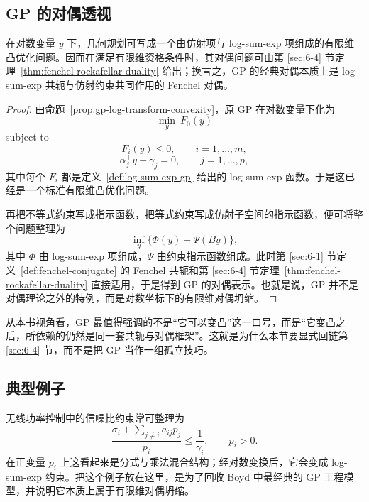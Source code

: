\subsection{GP 的对偶透视}

\begin{theorem}\label{thm:gp-duality-fenchel}
在对数变量 $y$ 下，几何规划可写成一个由仿射项与 log-sum-exp 项组成的有限维凸优化问题。因而在满足有限维资格条件时，其对偶问题可由第 \ref{sec:6-4} 节定理~\ref{thm:fenchel-rockafellar-duality} 给出；换言之，GP 的经典对偶本质上是 log-sum-exp 共轭与仿射约束共同作用的 Fenchel 对偶。
\end{theorem}

\begin{proof}
由命题~\ref{prop:gp-log-transform-convexity}，原 GP 在对数变量下化为
\[
\min_y\ F_0(y)
\]
subject to
\[
F_i(y)\le 0,\qquad i=1,\dots,m,
\]
\[
\alpha_j^\top y+\gamma_j=0,\qquad j=1,\dots,p,
\]
其中每个 $F_i$ 都是定义~\ref{def:log-sum-exp-gp} 给出的 log-sum-exp 函数。于是这已经是一个标准有限维凸优化问题。

再把不等式约束写成指示函数，把等式约束写成仿射子空间的指示函数，便可将整个问题整理为
\[
\inf_y \{\Phi(y)+\Psi(By)\},
\]
其中 $\Phi$ 由 log-sum-exp 项组成，$\Psi$ 由约束指示函数组成。此时第 \ref{sec:6-1} 节定义~\ref{def:fenchel-conjugate} 的 Fenchel 共轭和第 \ref{sec:6-4} 节定理~\ref{thm:fenchel-rockafellar-duality} 直接适用，于是得到 GP 的对偶表示。也就是说，GP 并不是对偶理论之外的特例，而是对数坐标下的有限维对偶坍缩。
\end{proof}

\begin{remark}
从本书视角看，GP 最值得强调的不是“它可以变凸”这一口号，而是“它变凸之后，所依赖的仍然是同一套共轭与对偶框架”。这就是为什么本节要显式回链第 \ref{sec:6-4} 节，而不是把 GP 当作一组孤立技巧。
\end{remark}

\subsection{典型例子}

\begin{example}[功率控制的几何规划]\label{ex:power-control-gp}
无线功率控制中的信噪比约束常可整理为
\[
\frac{\sigma_i+\sum_{j\neq i} a_{ij}p_j}{p_i}\le \frac{1}{\gamma_i},
\qquad p_i>0.
\]
在正变量 $p_i$ 上这看起来是分式与乘法混合结构；经对数变换后，它会变成 log-sum-exp 约束。把这个例子放在这里，是为了回收 Boyd 中最经典的 GP 工程模型，并说明它本质上属于有限维对偶坍缩。
\end{example}

